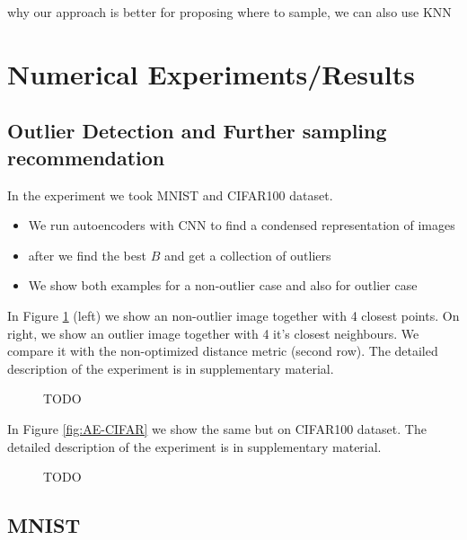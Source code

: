 \documentclass{article}
\begin{document}
why our approach is better for proposing where to sample, we can also use KNN










\clearpage
\onecolumn 
\section{Numerical Experiments/Results}


\subsection{Outlier Detection and Further sampling recommendation}

In the experiment we took MNIST and CIFAR100 dataset.
\begin{itemize}
\item We run autoencoders with CNN to 
find a condensed representation of images
\item after we find the best $B$ and get a collection of outliers
\item We show both examples for a non-outlier case and also for outlier case
\end{itemize}


In Figure \ref{fig:AE-MNIST}
(left) we show an non-outlier image together with 4 closest points.
On right, we show an outlier image together with 4 it's closest neighbours.
We compare it with the non-optimized distance metric (second row). The detailed description of the experiment is in supplementary material.
\begin{figure}[h!]

\caption{TODO}
\label{fig:AE-MNIST}

\end{figure}

In Figure \eqref{fig:AE-CIFAR}
we show the same but on CIFAR100 dataset.
The detailed description of the experiment is in supplementary material.
\begin{figure}[h!]

\caption{TODO}
\label{fig:AE-CIFAR}

\end{figure}

 
 \clearpage 

\subsection{MNIST}
\end{document}
